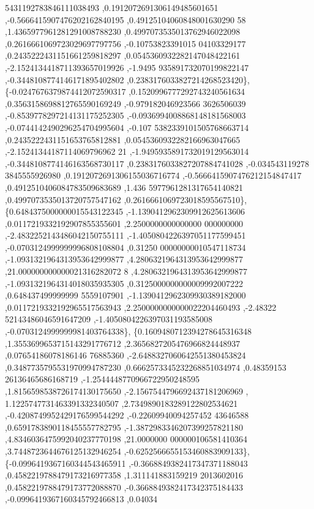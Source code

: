 \begin{DoxyCode}
      5431192783846111038493 ,0.1912072691306149485601651 ,-0.5666415907476202162840195 ,0.49125104060848001630290
      58 ,1.4365977961281291008788230 ,0.4997073535013762946022098 ,0.2616661069723029697797756 ,-0.10753823391015
      04103329177 ,0.2435222431151661259818297 ,0.0545360932282147048422161 ,-2.1524134418711393657019926 ,-1.9495
      935891732070199822147 ,-0.3448108774146171895402802 ,0.2383176033827214268523420\},
\{-0.0247676379874412072590317 ,0.1520996777292743240561634 ,0.3563158698812765590169249 ,-0.979182046923566
      3626506039 ,-0.8539778297214131175252305 ,-0.0936994008868148181568003 ,-0.0744142490296254704995604 ,-0.107
      5382339101505768663714 ,0.2435222431151653765812881 ,0.0545360932282166963047665 ,-2.15241344187114069796962
      21 ,-1.9495935891732019129563014 ,-0.3448108774146163568730117 ,0.2383176033827207884741028 ,-0.034543119278
      3845555926980 ,0.1912072691306155036716774 ,-0.5666415907476212154847417 ,0.4912510406084783509683689 ,1.436
      5977961281317654140821 ,0.4997073535013720757547162 ,0.2616661069723018595567510\},
\{0.6484375000000015543122345 ,-1.1390412962309912625613606 ,0.0117219332192907855355601 ,2.2500000000000000
      000000000 ,-2.4832252143486042150755111 ,-1.4050804226397051177599451 ,-0.0703124999999996808108804 ,0.31250
      00000000010547118734 ,-1.0931321964313953642999877 ,4.2806321964313953642999877 ,21.000000000000021316282072
      8 ,4.2806321964313953642999877 ,-1.0931321964314018035935305 ,0.3125000000000009992007222 ,0.648437499999999
      5559107901 ,-1.1390412962309930389182000 ,0.0117219332192965517563943 ,2.2500000000000022204460493 ,-2.48322
      52143486046591647209 ,-1.4050804226397031193585008 ,-0.0703124999999981403764338\},
\{0.1609480712394278645316348 ,1.3553699653715143291776712 ,2.3656827205476966824448937 ,0.07654186078186146
      76885360 ,-2.6488327060642551380453824 ,0.3487735795531970994787230 ,0.6662573345232268851034974 ,0.48359153
      26136465686168719 ,-1.2544448770966722950248595 ,1.8156598538726174130175650 ,-2.1567544796692437181206969 ,
      1.1225747731463391332340507 ,2.7349890183289122802534621 ,-0.4208749952429176599544292 ,-0.22609940094257452
      43646588 ,0.6591783890118455557782795 ,-1.3872983346207399257821180 ,4.8346036475992040237770198 ,21.0000000
      000000106581410364 ,3.7448723644676125132946254 ,-0.6252566655153460883909133\},
\{-0.0996419367160344543465911 ,-0.3668849382417347371188043 ,0.4582219788479173216977358 ,1.311141883159219
      2013602016 ,0.4582219788479173772088870 ,-0.3668849382417342375184433 ,-0.0996419367160345792466813 ,0.04034

\end{DoxyCode}
